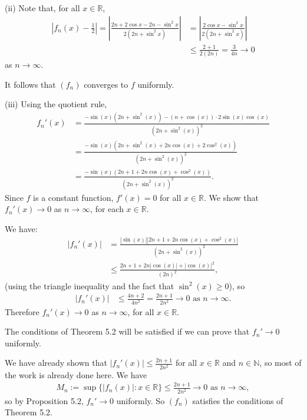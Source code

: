 \documentclass[letterpaper,10pt,english]{jupyterBook}
\begin{document}
\sphinxAtStartPar
(ii) Note that, for all \(x\in\mathbb{R}\),
\begin{align*}
\left|f_n(x) - \frac{1}{2}\right| =  \left| \frac{2n+2\cos x -2n -\sin^2 x}{2(2n+\sin^2 x)} \right| 
&= \left| \frac{2\cos x -\sin^2 x}{2(2n+\sin^2 x)} \right| \\
&\leq \frac{2+1}{2(2n)}=\frac{3}{4n} \rightarrow 0 
\end{align*}
\sphinxAtStartPar
as \(n\rightarrow \infty\).

It follows that \((f_n)\) converges to \(f\) uniformly.

\sphinxAtStartPar
(iii) Using the quotient rule,
\begin{align*}
f_n'(x) &= \frac{-\sin(x)(2n+\sin^2(x))-(n+\cos(x))\cdot 2\sin(x)\cos(x)}{\left(2n+\sin^2(x)\right)^2} \\
&= \frac{-\sin(x)\left(2n+\sin^2(x)+2n\cos(x)+2\cos^2(x)\right)}{\left(2n+\sin^2(x)\right)^2} \\
&= \frac{-\sin(x)\left(2n+1+2n\cos(x)+\cos^2(x)\right)}{\left(2n+\sin^2(x)\right)^2}.
\end{align*}
\sphinxAtStartPar
Since \(f\) is a constant function, \(f'(x)=0\) for all \(x\in\mathbb{R}\). We show that \(f_n'(x)\rightarrow 0\) as \(n\rightarrow\infty\), for each \(x\in\mathbb{R}\).

We have:
\begin{align*}
|f_n'(x)| &= \frac{|\sin(x)|\left|2n+1+2n\cos(x)+\cos^2(x)\right|}{\left(2n+\sin^2(x)\right)^2} \\
&\leq \frac{2n+1+2n|\cos(x)|+|\cos(x)|^2}{\left(2n\right)^2},
\end{align*}
\sphinxAtStartPar
(using the triangle inequality and the fact that \(\sin^2(x)\geq 0\)), so
\begin{align*}
|f_n'(x)| &\leq \frac{4n+2}{4n^2} = \frac{2n+1}{2n^2} \rightarrow 0 \text{ as } n\rightarrow \infty.
\end{align*}
\sphinxAtStartPar
Therefore \(f_n'(x)\rightarrow 0\) as \(n\rightarrow \infty\), for all \(x\in\mathbb{R}\).

The conditions of Theorem 5.2 will be satisfied if we can prove that \(f_n'\rightarrow 0\) uniformly.

We have already shown that \(|f_n'(x)|\leq \frac{2n+1}{2n^2}\) for all \(x\in\mathbb{R}\) and \(n\in\mathbb{N}\), so most of the work is already done here. We have
\begin{equation*}
\begin{split}
M_n := \sup\{|f_n(x)|:x\in\mathbb{R}\} \leq \frac{2n+1}{2n^2}\rightarrow 0 \text{ as } n\rightarrow\infty,
\end{split}
\end{equation*}
\sphinxAtStartPar
so by Proposition 5.2, \(f_n'\rightarrow 0\) uniformly. So \((f_n)\) satisfies the conditions of Theorem 5.2.
\end{document}
